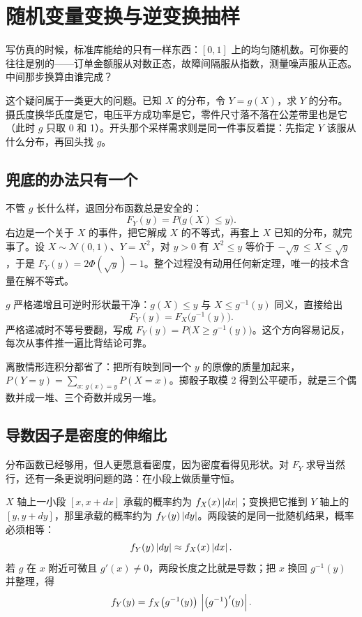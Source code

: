\section{随机变量变换与逆变换抽样}
\label{sec:05-Probability/03-Random-Variables/04}

写仿真的时候，标准库能给的只有一样东西：\([0,1]\) 上的均匀随机数。可你要的往往是别的——订单金额服从对数正态，故障间隔服从指数，测量噪声服从正态。中间那步换算由谁完成？

这个疑问属于一类更大的问题。已知 \(X\) 的分布，令 \(Y=g(X)\)，求 \(Y\) 的分布。摄氏度换华氏度是它，电压平方成功率是它，零件尺寸落不落在公差带里也是它（此时 \(g\) 只取 0 和 1）。开头那个采样需求则是同一件事反着提：先指定 \(Y\) 该服从什么分布，再回头找 \(g\)。

\subsection{兜底的办法只有一个}

不管 \(g\) 长什么样，退回分布函数总是安全的：
\[
F_Y(y)=P\bigl(g(X)\le y\bigr).
\]
右边是一个关于 \(X\) 的事件，把它解成 \(X\) 的不等式，再套上 \(X\) 已知的分布，就完事了。设 \(X\sim\mathcal N(0,1)\)、\(Y=X^2\)，对 \(y>0\) 有 \(X^2\le y\) 等价于 \(-\sqrt y\le X\le\sqrt y\)，于是 \(F_Y(y)=2\Phi(\sqrt y)-1\)。整个过程没有动用任何新定理，唯一的技术含量在解不等式。

\(g\) 严格递增且可逆时形状最干净：\(g(X)\le y\) 与 \(X\le g^{-1}(y)\) 同义，直接给出
\[
F_Y(y)=F_X\bigl(g^{-1}(y)\bigr).
\]
严格递减时不等号要翻，写成 \(F_Y(y)=P\bigl(X\ge g^{-1}(y)\bigr)\)。这个方向容易记反，每次从事件推一遍比背结论可靠。

离散情形连积分都省了：把所有映到同一个 \(y\) 的原像的质量加起来，\(P(Y=y)=\sum_{x:\,g(x)=y}P(X=x)\)。掷骰子取模 2 得到公平硬币，就是三个偶数并成一堆、三个奇数并成另一堆。

\subsection{导数因子是密度的伸缩比}

分布函数已经够用，但人更愿意看密度，因为密度看得见形状。对 \(F_Y\) 求导当然行，还有一条更说明问题的路：在小段上做质量守恒。

\(X\) 轴上一小段 \([x,x+dx]\) 承载的概率约为 \(f_X(x)\left|dx\right|\)；变换把它推到 \(Y\) 轴上的 \([y,y+dy]\)，那里承载的概率约为 \(f_Y(y)\left|dy\right|\)。两段装的是同一批随机结果，概率必须相等：
\[
f_Y(y)\left|dy\right|\approx f_X(x)\left|dx\right|.
\]
若 \(g\) 在 \(x\) 附近可微且 \(g'(x)\ne0\)，两段长度之比就是导数；把 \(x\) 换回 \(g^{-1}(y)\) 并整理，得
\[
f_Y(y)=f_X\bigl(g^{-1}(y)\bigr)\,\left|\bigl(g^{-1}\bigr)'(y)\right|.
\]

